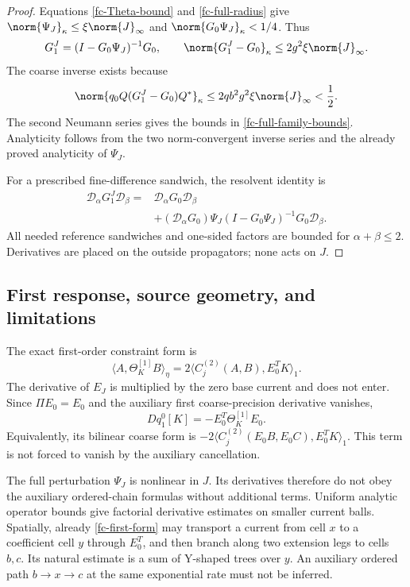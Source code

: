 \begin{proof}
Equations \eqref{fc-Theta-bound} and \eqref{fc-full-radius} give
$\norm{\Psi_J}_\kappa\le\xi\norm{J}_\infty$ and
$\norm{G_0\Psi_J}_\kappa<1/4$. Thus
\[
 G_1^J=(I-G_0\Psi_J)^{-1}G_0,
 \qquad
 \norm{G_1^J-G_0}_\kappa\le2g^2\xi\norm{J}_\infty.
\]
The coarse inverse exists because
\[
 \norm{q_0 Q(G_1^J-G_0)Q^*}_\kappa
 \le2qb^2g^2\xi\norm{J}_\infty<\frac12.
\]
The second Neumann series gives the bounds in
\eqref{fc-full-family-bounds}. Analyticity follows from the two
norm-convergent inverse series and the already proved analyticity
of $\Psi_J$.

For a prescribed fine-difference sandwich, the resolvent identity is
\[
 \begin{split}
 \mathcal D_\alpha G_1^J\mathcal D_\beta
 ={}&\mathcal D_\alpha G_0\mathcal D_\beta\\
 &+(\mathcal D_\alpha G_0)\Psi_J
       (I-G_0\Psi_J)^{-1}G_0\mathcal D_\beta.
 \end{split}
\]
All needed reference sandwiches and one-sided factors are bounded
for $\alpha+\beta\le2$. Derivatives are placed on the outside
propagators; none acts on $J$.
\end{proof}

\subsection{First response, source geometry, and limitations}
\label{fc-response-scope}

The exact first-order constraint form is
\begin{equation}
 \langle A,\Theta_K^{[1]}B\rangle_\eta
    =2\langle C_j^{(2)}(A,B),E_0^T K\rangle_1.
 \label{fc-first-form}
\end{equation}
The derivative of $E_J$ is multiplied by the zero base current and
does not enter. Since $\Pi E_0=E_0$ and the auxiliary first
coarse-precision derivative vanishes,
\begin{equation}
 Dq_1^0[K]=-E_0^T\Theta_K^{[1]}E_0.
 \label{fc-first-precision}
\end{equation}
Equivalently, its bilinear coarse form is
$-2\langle C_j^{(2)}(E_0B,E_0C),E_0^TK\rangle_1$.
This term is not forced to vanish by the auxiliary cancellation.

The full perturbation $\Psi_J$ is nonlinear in $J$. Its derivatives
therefore do not obey the auxiliary ordered-chain formulas without
additional terms. Uniform analytic operator bounds give factorial
derivative estimates on smaller current balls. Spatially, already
\eqref{fc-first-form} may transport a current from cell $x$ to a
coefficient cell $y$ through $E_0^T$, and then branch along two
extension legs to cells $b,c$. Its natural estimate is a sum of
Y-shaped trees over $y$. An auxiliary ordered path
$b\to x\to c$ at the same exponential rate must not be inferred.

